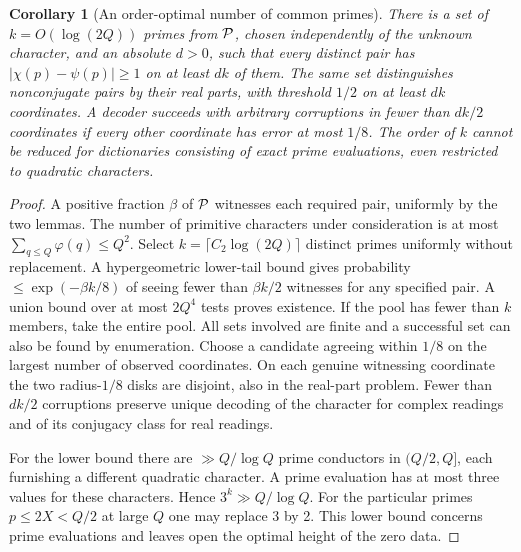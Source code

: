 \documentclass[11pt,letterpaper]{article}
\newtheorem{corollary}[theorem]{Corollary}
\begin{document}
\begin{corollary}[An order-optimal number of common primes]\label{cor:dict}
There is a set of $k=O(\log(2Q))$ primes from $\mathcal P$, chosen independently of the unknown character, and an absolute $d>0$, such that every distinct pair has $|\chi(p)-\psi(p)|\ge1$ on at least $dk$ of them. The same set distinguishes nonconjugate pairs by their real parts, with threshold $1/2$ on at least $dk$ coordinates. A decoder succeeds with arbitrary corruptions in fewer than $dk/2$ coordinates if every other coordinate has error at most $1/8$. The order of $k$ cannot be reduced for dictionaries consisting of exact prime evaluations, even restricted to quadratic characters.
\end{corollary}
\begin{proof}
A positive fraction $\beta$ of $\mathcal P$ witnesses each required pair, uniformly by the two lemmas. The number of primitive characters under consideration is at most $\sum_{q\le Q}\varphi(q)\le Q^2$. Select $k=\lceil C_2\log(2Q)\rceil$ distinct primes uniformly without replacement. A hypergeometric lower-tail bound gives probability $\le\exp(-\beta k/8)$ of seeing fewer than $\beta k/2$ witnesses for any specified pair. A union bound over at most $2Q^4$ tests proves existence. If the pool has fewer than $k$ members, take the entire pool. All sets involved are finite and a successful set can also be found by enumeration. Choose a candidate agreeing within $1/8$ on the largest number of observed coordinates. On each genuine witnessing coordinate the two radius-$1/8$ disks are disjoint, also in the real-part problem. Fewer than $dk/2$ corruptions preserve unique decoding of the character for complex readings and of its conjugacy class for real readings.

For the lower bound there are $\gg Q/\log Q$ prime conductors in $(Q/2,Q]$, each furnishing a different quadratic character. A prime evaluation has at most three values for these characters. Hence $3^k\gg Q/\log Q$. For the particular primes $p\le2X<Q/2$ at large $Q$ one may replace 3 by 2. This lower bound concerns prime evaluations and leaves open the optimal height of the zero data.
\end{proof}
\end{document}
